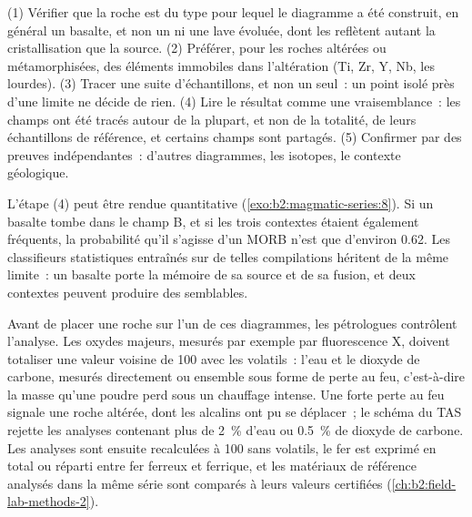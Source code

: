 \begin{method}\label{met:b2:magmatic-series:discrimination}
(1) Vérifier que la roche est du type pour lequel le diagramme a été construit, en général un
basalte, et non un  ni une lave évoluée, dont les  reflètent autant la
cristallisation que la source. (2) Préférer, pour les roches altérées ou métamorphisées, des
éléments immobiles dans l'altération (Ti, Zr, Y, Nb, les  lourdes). (3) Tracer une suite
d'échantillons, et non un seul~: un point isolé près d'une limite ne décide de rien. (4) Lire le
résultat comme une vraisemblance~: les champs ont été tracés autour de la plupart, et non de la
totalité, de leurs échantillons de référence, et certains champs sont partagés. (5) Confirmer par des
preuves indépendantes~: d'autres diagrammes, les isotopes, le contexte géologique.
\end{method}

L'étape (4) peut être rendue quantitative (\cref{exo:b2:magmatic-series:8}). Si un basalte tombe dans
le champ B, et si les trois contextes étaient également fréquents, la probabilité qu'il s'agisse
d'un MORB n'est que d'environ 0.62. Les classifieurs statistiques entraînés sur de telles compilations
héritent de la même limite~: un basalte porte la mémoire de sa source et de sa fusion, et deux
contextes peuvent produire des  semblables.

\begin{inthelab}
Avant de placer une roche sur l'un de ces diagrammes, les pétrologues contrôlent l'analyse. Les
oxydes majeurs, mesurés par exemple par fluorescence X, doivent totaliser une valeur voisine de 100
avec les volatils~: l'eau et le dioxyde de carbone, mesurés directement ou ensemble sous forme de
perte au feu, c'est-à-dire la masse qu'une poudre perd sous un chauffage intense. Une forte
perte au feu signale une roche altérée, dont les alcalins ont pu se déplacer~; le schéma du TAS rejette
les analyses contenant plus de \qty{2}{\percent} d'eau ou
\qty{0.5}{\percent} de dioxyde de carbone. Les analyses sont ensuite recalculées à 100 sans
volatils, le fer est exprimé en  total ou réparti entre fer ferreux et ferrique, et
les matériaux de référence analysés dans la même série sont comparés à leurs valeurs certifiées
(\cref{ch:b2:field-lab-methods-2}).
\end{inthelab}

